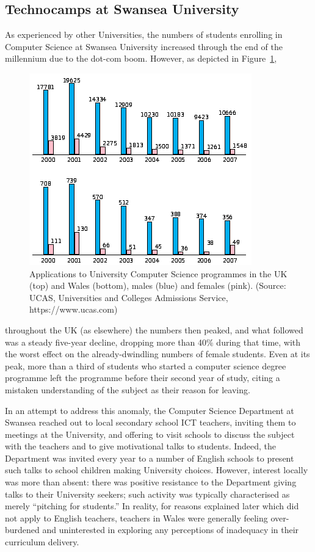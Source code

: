 \documentclass{sig-alternate}
\begin{document}
\subsection{Technocamps at Swansea University}
As experienced by other Universities,
the numbers of students enrolling in Computer Science
at Swansea University increased through the end
of the millennium due to the dot-com boom.
However, as depicted in Figure~\ref{fig:numbers},
\begin{figure}
  \centering
  \includegraphics[width=0.9\columnwidth]{images/numbers.png}
  \caption{Applications to University Computer Science programmes
           in the UK (top) and Wales (bottom), males (blue) and females (pink).
           (Source: UCAS, Universities and Colleges Admissions Service,
            https://www.ucas.com)}
  \label{fig:numbers}
\end{figure}
throughout the UK (as elsewhere) the numbers then peaked, and what followed
was a steady five-year decline, dropping more than 40\% during that time,
with the worst effect on the already-dwindling numbers
of female students.
Even at its peak, more than a third of students who
started a computer science degree programme left
the programme before their second year of study,
citing a mistaken understanding of the subject
as their reason for leaving.

In an attempt to address this anomaly,
the Computer Science Department at Swansea reached out
to local secondary school ICT teachers,
inviting them to meetings at the University,
and offering to visit schools to discuss
the subject with the teachers and to give
motivational talks to students.
Indeed, the Department was invited every year to
a number of English schools to present such talks
to school children making University choices.
However, interest locally was more than absent:
there was positive resistance to the Department
giving talks to their University seekers;
such activity was typically characterised as merely ``pitching for students.''
In reality, for reasons explained later
which did not apply to English teachers,
teachers in Wales were generally feeling over-burdened and
uninterested in exploring any perceptions
of inadequacy in their curriculum delivery.
\end{document}
